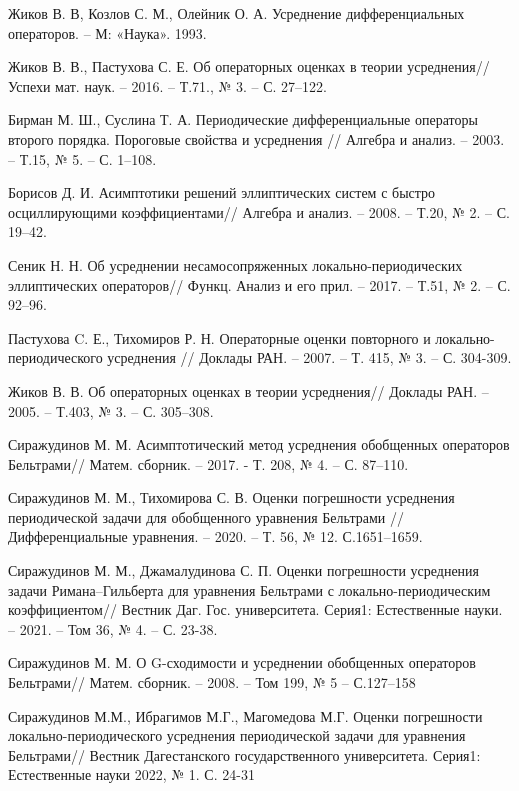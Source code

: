 \documentclass[a4paper,12pt]{article}
\theoremstyle{definition}
\begin{document}
\begin{thebibliography}{22}
  Жиков В. В, Козлов С. М., Олейник О. А. Усреднение дифференциальных операторов. – М: «Наука». 1993.

  Жиков В. В., Пастухова С. Е. Об операторных оценках в теории усреднения//Успехи мат. наук. – 2016. – Т.71., № 3. – С. 27–122.

  Бирман М. Ш., Суслина Т. А. Периодические дифференциальные операторы второго порядка. Пороговые свойства  и усреднения // Алгебра  и  анализ. – 2003. – Т.15, № 5. – С. 1–108.

  Борисов Д. И. Асимптотики решений эллиптических систем с быстро осциллирующими коэффициентами// Алгебра и анализ. – 2008. – Т.20, № 2. – С. 19–42.

  Сеник Н. Н. Об усреднении несамосопряженных локально-периодических эллиптических операторов// Функц. Анализ и его прил. – 2017. – Т.51, № 2. – С. 92–96.

  Пастухова C. Е., Тихомиров Р. Н. Операторные оценки повторного  и локально-периодического  усреднения // Доклады РАН. – 2007. – Т. 415, № 3. –  С. 304-309.

  Жиков В. В. Об операторных оценках в теории усреднения// Доклады РАН. – 2005. – Т.403, № 3. – С. 305–308.

  Сиражудинов М. М. Асимптотический метод усреднения обобщенных  операторов Бельтрами// Матем. сборник. – 2017. - Т. 208, № 4. – С. 87–110.

  Сиражудинов М. М., Тихомирова С. В. Оценки погрешности усреднения периодической задачи для обобщенного уравнения Бельтрами // Дифференциальные уравнения. – 2020. – Т. 56, № 12.  С.1651–1659.

  Сиражудинов М. М., Джамалудинова С. П. Оценки погрешности усреднения задачи Римана–Гильберта для уравнения Бельтрами с локально-периодическим коэффициентом//  Вестник Даг. Гос. университета. Серия1: Естественные науки. – 2021. – Том 36, № 4. – С. 23-38.

  Сиражудинов М. М. О G-сходимости и усреднении обобщенных операторов Бельтрами// Матем. сборник. – 2008. – Том 199, № 5 – С.127–158

  	Сиражудинов М.М., Ибрагимов М.Г., Магомедова М.Г. Оценки погрешности локально-периодического усреднения периодической задачи для уравнения Бельтрами// Вестник Дагестанского государственного университета. Серия1: Естественные науки 2022, № 1. С. 24-31


\end{thebibliography}
\end{document}
